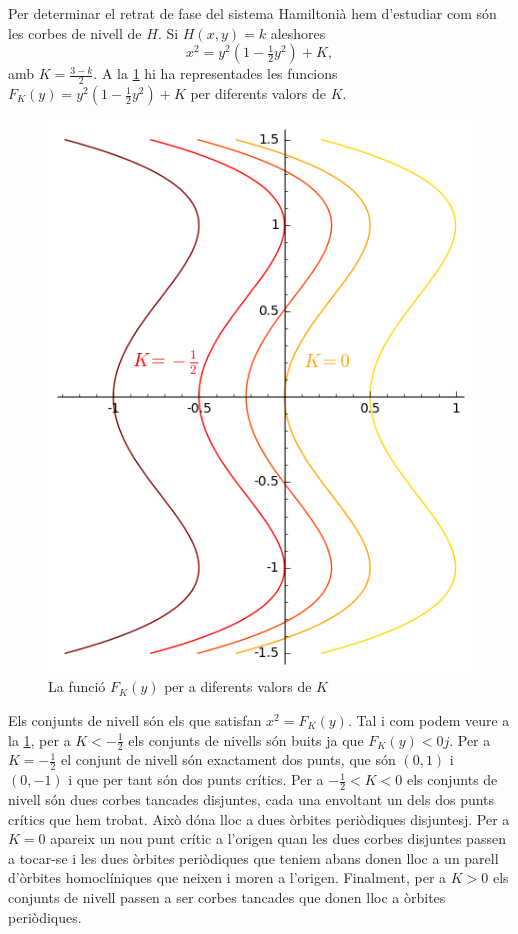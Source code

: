 \documentclass[12pt]{article}
\begin{document}
\begin{enumerate}[label=(\roman*), font=\bfseries \sffamily, wide, labelwidth=!, labelindent=0pt]
		Per determinar el retrat de fase del sistema Hamiltonià hem d'estudiar com són les corbes de nivell de \( H \). Si \( H(x, y) = k \) aleshores
		\begin{equation*}
			x^2 = y^2\left(1 - \tfrac{1}{2}y^2\right) + K,
		\end{equation*}
		amb \( K = \frac{3-k}{2} \). A la \cref{fig:valors del hamiltonia} hi ha representades les funcions \( F_K(y) = y^2\left(1 - \tfrac{1}{2}y^2\right) + K \) per diferents valors de \( K \).
		
		\begin{figure}[htb]
			\centering \sffamily \small
			\includegraphics[scale = 0.7]{hamiltonia}
			\caption{La funció \( F_K(y) \) per a diferents valors de \( K \)}
			\label{fig:valors del hamiltonia}
		\end{figure}
		
		Els conjunts de nivell són els que satisfan \( x^2 = F_K(y) \).  Tal i com podem veure a la \cref{fig:valors del hamiltonia}, per a \( K < - \tfrac{1}{2} \) els conjunts de nivells són buits ja que \( F_K(y) < 0j \). Per a \( K = - \frac{1}{2} \)	el conjunt de nivell són exactament dos punts, que són \( (0,1) \) i \( (0,-1) \) i que per tant són dos punts crítics. Per a \( - \frac{1}{2} < K < 0 \) els conjunts de nivell són dues corbes tancades disjuntes, cada una envoltant un dels dos punts crítics que hem trobat. Això dóna lloc a dues òrbites periòdiques disjuntesj. Per a \( K = 0 \) apareix un nou punt crític a l'origen quan les dues corbes disjuntes passen a tocar-se i les dues òrbites periòdiques que teniem abans donen lloc a un parell d'òrbites homoclíniques que neixen i moren a l'origen. Finalment, per a \( K > 0 \) els conjunts de nivell passen a ser corbes tancades que donen lloc a òrbites periòdiques.  


\end{enumerate}
\end{document}

